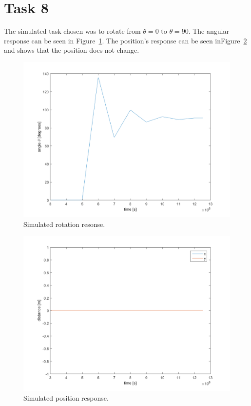\documentclass[a4paper,12pt,oneside,onecolumn]{article} %
\begin{document}
\section*{Task 8}
 	The simulated task chosen was to rotate from $\theta = 0$ to $\theta = 90$. The angular response can be seen in Figure~\ref{fig:task8_angleplot}. The position's response can be seen inFigure~\ref{fig:task8_posplot} and shows that the position does not change. 
    \begin{figure}[H]
        \centering
        \includegraphics[scale = 0.5]{../matlab/images/task8_angleplot.png}
        \caption{Simulated rotation resonse.}
        \label{fig:task8_angleplot}
    \end{figure}
    \begin{figure}[H]
        \centering
        \includegraphics[scale = 0.5]{../matlab/images/task8_posplot.png}
        \caption{Simulated position response.}
        \label{fig:task8_posplot}
    \end{figure}
\end{document}

